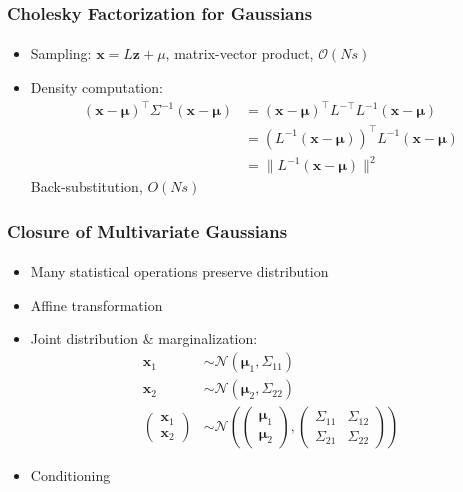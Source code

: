 \documentclass{beamer}                             %
\renewcommand{\vec}[1]{\bm{#1}}
\begin{document}
\begin{frame}
\frametitle{Cholesky Factorization for Gaussians}
\framesubtitle{}
\begin{itemize}
  \item Sampling: \( \vec{x} = L \vec{z} + \mu \),
    matrix-vector product, \( \mathcal{O}(Ns) \)
  \item Density computation:
    \begin{align*}
      (\vec{x} - \vec{\mu})^{\top} \Sigma^{-1} (\vec{x} - \vec{\mu})
      &= (\vec{x} - \vec{\mu})^{\top} L^{-\top} L^{-1} (\vec{x} - \vec{\mu}) \\
      &= (L^{-1} (\vec{x} - \vec{\mu}))^{\top} L^{-1} (\vec{x} - \vec{\mu}) \\
      &= \lVert L^{-1} (\vec{x} - \vec{\mu}) \rVert^2
    \end{align*}
    Back-substitution, \( O(Ns) \)
\end{itemize}
\end{frame}

\begin{frame}
\frametitle{Closure of Multivariate Gaussians}
\framesubtitle{}
\begin{itemize}
  \item<+-> Many statistical operations preserve distribution
  \item<+-> Affine transformation
  \item<+-> Joint distribution \& marginalization:
    \begin{align*}
      \vec{x}_1 &\sim \mathcal{N}(\vec{\mu}_1, \Sigma_{11}) \\
      \vec{x}_2 &\sim \mathcal{N}(\vec{\mu}_2, \Sigma_{22}) \\
      \begin{pmatrix}
        \vec{x}_1 \\
        \vec{x}_2
      \end{pmatrix}
      &\sim
      \mathcal{N} \left (
      \begin{pmatrix}
        \vec{\mu}_1 \\
        \vec{\mu}_2
      \end{pmatrix},
      \begin{pmatrix}
        \Sigma_{11} & \Sigma_{12} \\
        \Sigma_{21} & \Sigma_{22}
      \end{pmatrix} \right )
    \end{align*}
  \item<+-> Conditioning
\end{itemize}
\end{frame}
\end{document}
